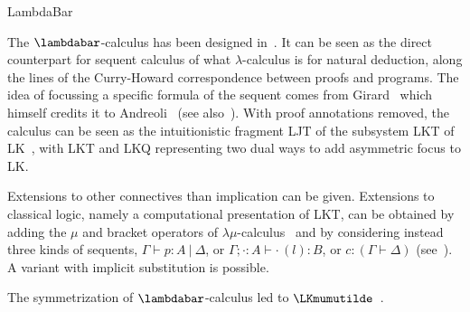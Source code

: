 \begin{entry}{LambdaBar}
\begin{history}
The $\lambdabar$-calculus has been designed
in~\cite{Herbelin94,HerbelinPhD}. It can be seen as the direct counterpart
for sequent calculus of what $\lambda$-calculus is for natural
deduction, along the lines of the Curry-Howard correspondence between
proofs and programs. The idea of focussing a specific formula of the
sequent comes from Girard~\cite{girard91mscs} which himself credits it to
Andreoli~\cite{andreoli92jlc} (see also~). With proof
annotations removed, the calculus can be seen as the intuitionistic
fragment LJT of the subsystem LKT of LK~\cite{danos93wll}, with LKT and
LKQ representing two dual ways to add asymmetric focus to LK.

Extensions to other connectives than implication can be given.
Extensions to classical logic, namely a computational presentation of
LKT, can be obtained by adding the $\mu$ and bracket operators of
$\lambda\mu$-calculus~ and by considering instead three
kinds of sequents, $\Gamma \vdash p:A ~|~ \Delta$, or
$\Gamma; \cdot:A \vdash \cdot\,(l):B$, or $c: (\Gamma \vdash \Delta)$
(see~\cite{HerbelinPhD}). A variant with implicit substitution is
possible.

The symmetrization of $\lambdabar$-calculus led to
$\LKmumutilde$~.
\end{history}











\end{entry}

